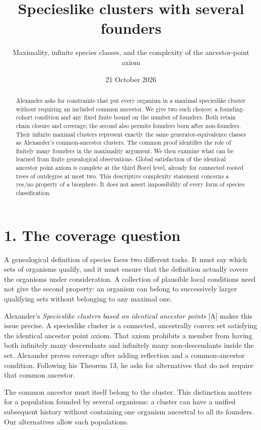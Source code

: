 \documentclass[
  11pt,
  letterpaper,
]{article}
\title{Specieslike clusters with several founders}
\subtitle{Maximality, infinite species classes, and the complexity of
the ancestor-point axiom}
\author{}
\date{21 October 2026}
\begin{document}
\maketitle
\begin{abstract}
Alexander asks for constraints that put every organism in a maximal
specieslike cluster without requiring an included common ancestor. We
give two such choices: a founding-cohort condition and any fixed finite
bound on the number of founders. Both retain chain closure and coverage;
the second also permits founders born after non-founders. Their infinite
maximal clusters represent exactly the same generator-equivalence
classes as Alexander's common-ancestor clusters. The common proof
identifies the role of finitely many founders in the maximality
argument. We then examine what can be learned from finite genealogical
observations. Global satisfaction of the identical ancestor point axiom
is complete at the third Borel level, already for connected rooted trees
of outdegree at most two. This descriptive complexity statement concerns
a yes/no property of a biosphere. It does not assert impossibility of
every form of species classification.
\end{abstract}

\section{1. The coverage question}\label{the-coverage-question}

A genealogical definition of species faces two different tasks. It must
say which sets of organisms qualify, and it must ensure that the
definition actually covers the organisms under consideration. A
collection of plausible local conditions need not give the second
property: an organism can belong to successively larger qualifying sets
without belonging to any maximal one.

Alexander's \emph{Specieslike clusters based on identical ancestor
points} {[}A{]} makes this issue precise. A specieslike cluster is a
connected, ancestrally convex set satisfying the identical ancestor
point axiom. That axiom prohibits a member from having both infinitely
many descendants and infinitely many non-descendants inside the set.
Alexander proves coverage after adding reflection and a common-ancestor
condition. Following his Theorem 13, he asks for alternatives that do
not require that common ancestor.

The common ancestor must itself belong to the cluster. This distinction
matters for a population founded by several organisms: a cluster can
have a unified subsequent history without containing one organism
ancestral to all its founders. Our alternatives allow such populations.
\end{document}
